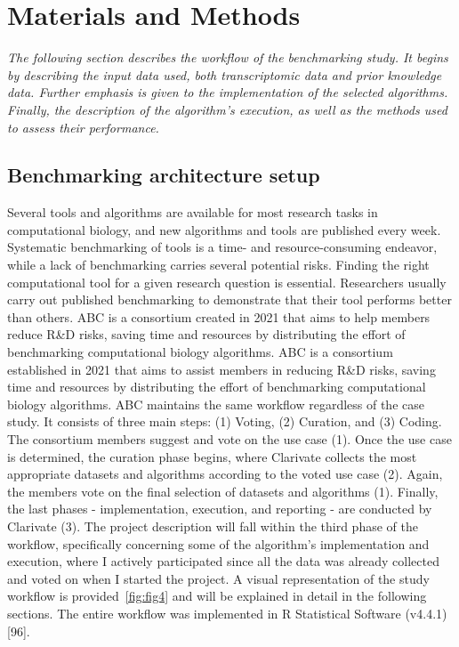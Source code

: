
%


\chapter{Materials and Methods}
\label{cha:materials_and_methods}


\textit{The following section describes the workflow of the benchmarking study. It begins by describing the input data used, both transcriptomic data and prior knowledge data. Further emphasis is given to the implementation of the selected algorithms. Finally, the description of the algorithm’s execution, as well as the methods used to assess their performance.}


\section{Benchmarking architecture setup} %
\label{sec:benchmarking_architecture_setup}
Several tools and algorithms are available for most research tasks in computational biology, and new algorithms and tools are published every week. Systematic benchmarking of tools is a time- and resource-consuming endeavor, while a lack of benchmarking carries several potential risks. Finding the right computational tool for a given research question is essential. Researchers usually carry out published benchmarking to demonstrate that their tool performs better than others. ABC is a consortium created in 2021 that aims to help members reduce R\&D risks, saving time and resources by distributing the effort of benchmarking computational biology algorithms. ABC is a consortium established in 2021 that aims to assist members in reducing R\&D risks, saving time and resources by distributing the effort of benchmarking computational biology algorithms. ABC maintains the same workflow regardless of the case study. It consists of three main steps: (1) Voting, (2) Curation, and (3) Coding. The consortium members suggest and vote on the use case (1). Once the use case is determined, the curation phase begins, where Clarivate collects the most appropriate datasets and algorithms according to the voted use case (2). Again, the members vote on the final selection of datasets and algorithms (1). Finally, the last phases - implementation, execution, and reporting - are conducted by Clarivate (3). 
The project description will fall within the third phase of the workflow, specifically concerning some of the algorithm's implementation and execution, where I actively participated since all the data was already collected and voted on when I started the project. A visual representation of the study workflow is provided~\ref{fig:fig4} and will be explained in detail in the following sections. The entire workflow was implemented in \gls{R} Statistical Software (v4.4.1) [96].

